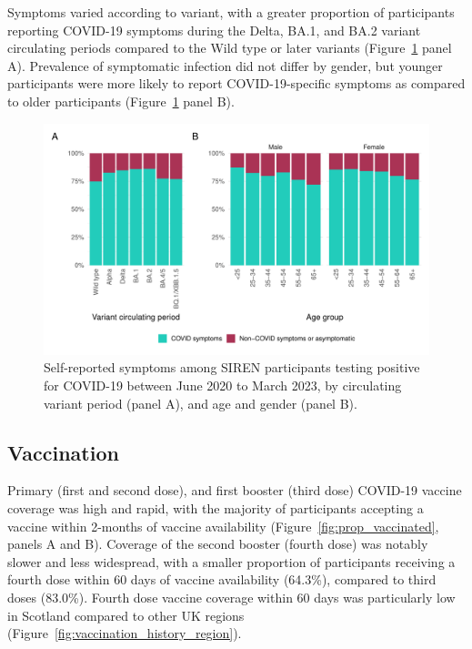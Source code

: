 Symptoms varied according to variant, with a greater proportion of participants reporting COVID-19 symptoms during the Delta, BA.1, and BA.2 variant circulating periods compared to the Wild type or later variants (Figure~\ref{fig:symptoms_age_sex} panel A). Prevalence of symptomatic infection did not differ by gender, but younger participants were more likely to report COVID-19-specific symptoms as compared to older participants (Figure~\ref{fig:symptoms_age_sex} panel B).
\newline
\newline

\begin{figure}[htbp!]
    \centering
    \includegraphics[width=\textwidth]{symptoms_age_sex.pdf}
    \caption[Self-reported symptoms among SIREN participants testing positive for COVID-19 between June 2020 to March 2023, by circulating variant period, and age and gender]{Self-reported symptoms among SIREN participants testing positive for COVID-19 between June 2020 to March 2023, by circulating variant period (panel A), and age and gender (panel B).}\label{fig:symptoms_age_sex}
\end{figure}

\subsection{Vaccination}

Primary (first and second dose), and first booster (third dose) COVID-19 vaccine coverage was high and rapid, with the majority of participants accepting a vaccine within 2-months of vaccine availability (Figure~\ref{fig:prop_vaccinated}, panels A and B). Coverage of the second booster (fourth dose) was notably slower and less widespread, with a smaller proportion of participants receiving a fourth dose within 60 days of vaccine availability (64.3\%), compared to third doses (83.0\%). Fourth dose vaccine coverage within 60 days was particularly low in Scotland compared to other UK regions (Figure~\ref{fig:vaccination_history_region}).

